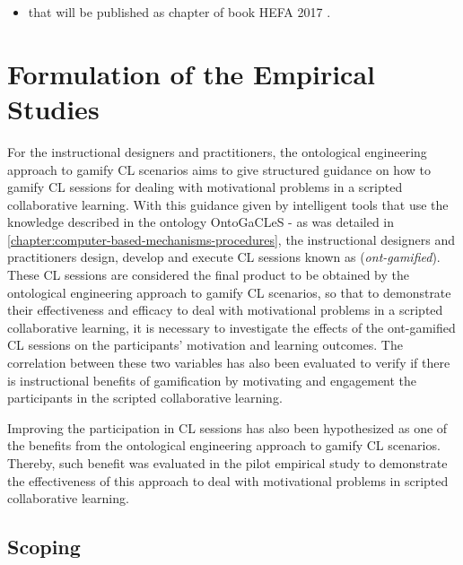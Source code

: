 \begin{itemize}
\item
{} that will be published as chapter of book  HEFA 2017 \cite{ChallcoMizoguchiIsotani2017}.
\end{itemize}

\section{Formulation of the Empirical Studies}
\label{sec:formulation-empirical-studies}

For the instructional designers and practitioners, the ontological engineering approach to gamify CL scenarios aims to give structured guidance on how to gamify CL sessions for dealing with motivational problems in a scripted collaborative learning.
With this guidance given by intelligent tools that use the knowledge described in the ontology OntoGaCLeS - as was detailed in \autoref{chapter:computer-based-mechanisms-procedures}, the instructional designers and practitioners design, develop and execute CL sessions known as  (\emph{ont-gamified}).
These CL sessions are considered the final product to be obtained by the ontological engineering approach to gamify CL scenarios, so that to demonstrate their effectiveness and efficacy to deal with motivational problems in a scripted collaborative learning, it is necessary to investigate the effects of the ont-gamified CL sessions on the participants' motivation and learning outcomes.
The correlation between these two variables has also been evaluated to verify if there is instructional benefits of gamification by motivating and engagement the participants in the scripted collaborative learning.

Improving the participation in CL sessions has also been hypothesized as one of the benefits from the ontological engineering approach to gamify CL scenarios.
Thereby, such benefit was evaluated in the pilot empirical study to demonstrate the effectiveness of this approach to deal with motivational problems in scripted collaborative learning.

\subsection{Scoping}
\label{subsec:scoping}

